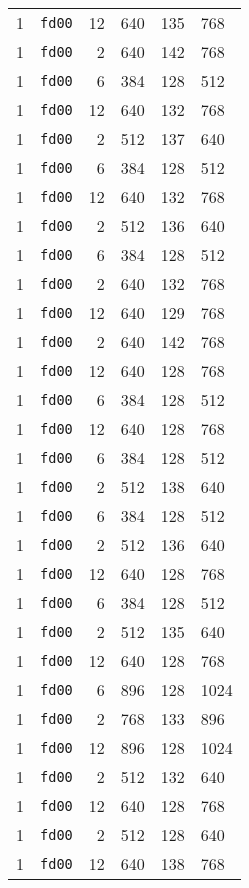 \documentclass{article}
\begin{document}
\begin{table}[h!]
\begin{tabular}{llrrrl}
    1 & \texttt{fd00} & 12 & 640 & 135 & 768 \\
    1 & \texttt{fd00} & 2 & 640 & 142 & 768 \\
    1 & \texttt{fd00} & 6 & 384 & 128 & 512 \\
    1 & \texttt{fd00} & 12 & 640 & 132 & 768 \\
    1 & \texttt{fd00} & 2 & 512 & 137 & 640 \\
    1 & \texttt{fd00} & 6 & 384 & 128 & 512 \\
    1 & \texttt{fd00} & 12 & 640 & 132 & 768 \\
    1 & \texttt{fd00} & 2 & 512 & 136 & 640 \\
    1 & \texttt{fd00} & 6 & 384 & 128 & 512 \\
    1 & \texttt{fd00} & 2 & 640 & 132 & 768 \\
    1 & \texttt{fd00} & 12 & 640 & 129 & 768 \\
    1 & \texttt{fd00} & 2 & 640 & 142 & 768 \\
    1 & \texttt{fd00} & 12 & 640 & 128 & 768 \\
    1 & \texttt{fd00} & 6 & 384 & 128 & 512 \\
    1 & \texttt{fd00} & 12 & 640 & 128 & 768 \\
    1 & \texttt{fd00} & 6 & 384 & 128 & 512 \\
    1 & \texttt{fd00} & 2 & 512 & 138 & 640 \\
    1 & \texttt{fd00} & 6 & 384 & 128 & 512 \\
    1 & \texttt{fd00} & 2 & 512 & 136 & 640 \\
    1 & \texttt{fd00} & 12 & 640 & 128 & 768 \\
    1 & \texttt{fd00} & 6 & 384 & 128 & 512 \\
    1 & \texttt{fd00} & 2 & 512 & 135 & 640 \\
    1 & \texttt{fd00} & 12 & 640 & 128 & 768 \\
    1 & \texttt{fd00} & 6 & 896 & 128 & 1024 \\
    1 & \texttt{fd00} & 2 & 768 & 133 & 896 \\
    1 & \texttt{fd00} & 12 & 896 & 128 & 1024 \\
    1 & \texttt{fd00} & 2 & 512 & 132 & 640 \\
    1 & \texttt{fd00} & 12 & 640 & 128 & 768 \\
    1 & \texttt{fd00} & 2 & 512 & 128 & 640 \\
    1 & \texttt{fd00} & 12 & 640 & 138 & 768 \\

\end{tabular}
\end{table}
\end{document}
